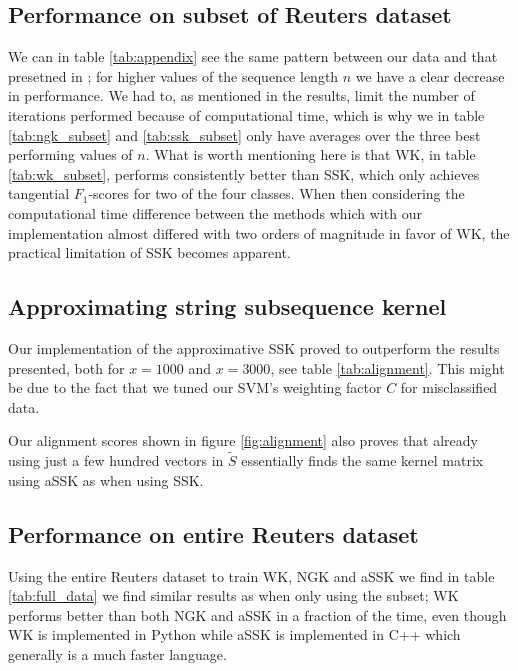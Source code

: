 \subsection{Performance on subset of Reuters dataset}
We can in table \ref{tab:appendix} see the same pattern between our data and that presetned in \cite{lodhi};  for higher values of the sequence length $ n $ we have a clear decrease in performance. We had to, as mentioned in the results, limit the number of iterations performed because of computational time, which is why we in table \ref{tab:ngk_subset} and \ref{tab:ssk_subset} only have averages over the three best performing values of $ n $. What is worth mentioning here is that WK, in table \ref{tab:wk_subset}, performs consistently better than SSK, which only achieves tangential $ F_1 $-scores for two of the four classes. When then considering the computational time difference between the methods which with our implementation almost differed with two orders of magnitude in favor of WK, the practical limitation of SSK becomes apparent. 

\subsection{Approximating string subsequence kernel}
Our implementation of the approximative SSK proved to outperform the results \cite{lodhi} presented, both for $ x=1000 $ and $ x=3000 $, see table \ref{tab:alignment}. This might be due to the fact that we tuned our SVM's weighting factor $ C $ for misclassified data. 

Our alignment scores shown in figure \ref{fig:alignment} also proves that already using just a few hundred vectors in $ \tilde{S} $ essentially finds the same kernel matrix using aSSK as when using SSK.

\subsection{Performance on entire Reuters dataset}
Using the entire Reuters dataset to train WK, NGK and aSSK we find in table \ref{tab:full_data} we find similar results as when only using the subset; WK performs better than both NGK and aSSK in a fraction of the time, even though WK is implemented in Python while aSSK is implemented in C++ which generally is a much faster language. 

